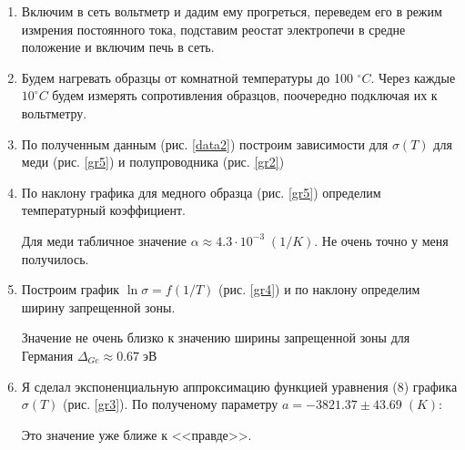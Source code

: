 \documentclass[a4paper]{article}
\begin{document}
\begin{enumerate}
    \item Включим в сеть вольтметр и дадим ему прогреться, переведем его в режим измрения постоянного тока, подставим 
    реостат электропечи в средне положение и включим печь в сеть.

    \item Будем нагревать образцы от комнатной температуры до 100 $^{\circ} C$. Через каждые $10 ^{\circ} C$ будем измерять сопротивления образцов, поочередно подключая их к вольтметру. 
    \item По полученным данным (рис. \ref{data2}) построим зависимости для $\sigma(T)$ для меди (рис. \ref{gr5}) и полупроводника (рис. \ref{gr2})
    \item По наклону графика для медного образца (рис. \ref{gr5}) определим температурный коэффициент. 

    \begin{center}
    \end{center}

    Для меди табличное значение $\alpha \approx 4.3 \cdot 10^{-3} \; (1/K)$. Не очень точно у меня получилось.
 
    \item Построим график $\ln{\sigma} = f(1/T)$ (рис. \ref{gr4}) и по наклону определим ширину запрещенной зоны. 

        \begin{center}
        \end{center}
        
        Значение не очень близко к значению ширины запрещенной зоны для Германия $\Delta_{Ge} \approx 0.67\; эВ$

    \item Я сделал экспоненциальную аппроксимацию функцией уравнения (8) графика $\sigma(T)$ (рис. \ref{gr3}). По полученому параметру $a = -3821.37 \pm 43.69 \; (K)$:
    
        \begin{center}
        \end{center}

        Это значение уже ближе к <<правде>>.

\end{enumerate}
\end{document}
